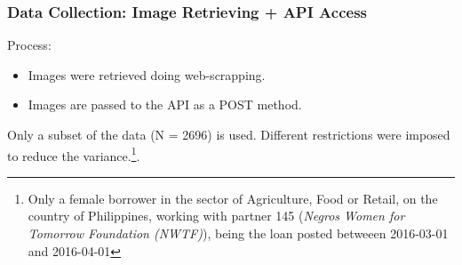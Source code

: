 \documentclass{beamer}
\begin{document}
\begin{frame}\frametitle{Data Collection: Image Retrieving + API Access}
Process:
\begin{itemize}
\item Images were retrieved doing web-scrapping.
\item Images are passed to the API as a POST method.
\end{itemize}
Only a subset of the data (N = 2696) is used. Different restrictions were imposed to reduce the variance.\footnote{Only a female borrower in the sector of Agriculture, Food or Retail, on the country of Philippines, working with partner 145 (\textit{Negros Women for Tomorrow Foundation (NWTF)}), being the loan posted betweeen 2016-03-01 and 2016-04-01}.

\end{frame}
% 
% 
% 
% 
% 
% 
%   
% 
% 
%   
%   
%   
% 
\end{document}
